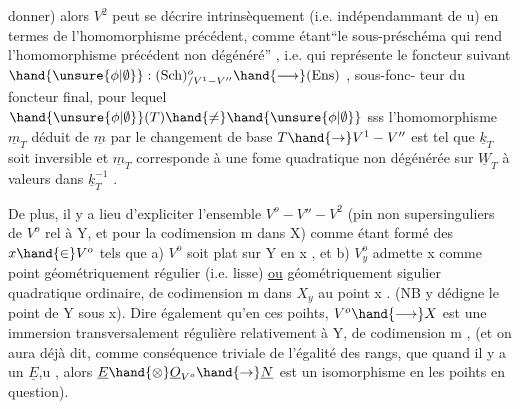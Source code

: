 donner) alors $V^2$ peut se décrire intrinsèquement (i.e. indépendammant de u)
 en termes de l'homomorphisme précédent, comme étant``le sous-préschéma
qui rend l'homomorphisme précédent non dégénéré'' , i.e. qui représente le
foncteur suivant $\hand{\unsure{\phi|\emptyset}} : (\mathrm{Sch})^{o}_{/V^1 - V''} \hand{\longrightarrow} (\mathrm{Ens})$ , sous-fonc-%
teur du foncteur final, pour lequel $\hand{\unsure{\phi|\emptyset}}(T)\hand{\neq} \hand{\unsure{\phi|\emptyset}}$ sss l'homomorphisme $\underline{m}_T$ déduit
de $\underline{m}$ par le changement de base $T \hand{\to} V^1 - V''$ est tel que $\underline{k}_T$ soit inversible et
$\underline{m}_T$ corresponde à une fome quadratique non dégénérée sur $\underline{W}_T$ à valeurs dans
$\underline{k}_T^{-1}$ .

De plus, il y a lieu  d'expliciter l'ensemble $V^o - V'' - V^2$ 
(pin non supersinguliers de $V^o$ rel à Y, et pour la codimension m dans X)
comme étant formé des $x \hand{\in} V^o$ tels que a) $V^o$ soit plat sur Y en x , et
b) $V^o_y$ admette x comme point géométriquement régulier (i.e. lisse) \uline{ou}
géométriquement sigulier quadratique ordinaire, de codimension m dans $X_y$
au point x . (NB y dédigne le point de Y sous x). Dire également qu'en ces
poihts, $V^o \hand{\longrightarrow} X$ est une immersion transversalement régulière relativement à
Y, de codimension m , (et on aura déjà dit, comme conséquence triviale de
l'égalité des rangs, que quand il y a un $\underline{E}$,u , alors $\underline{E}\hand{\otimes}\underline{O}_{V^o} \hand{\to} \underline{N}$ est un
isomorphisme en les poihts en question).

